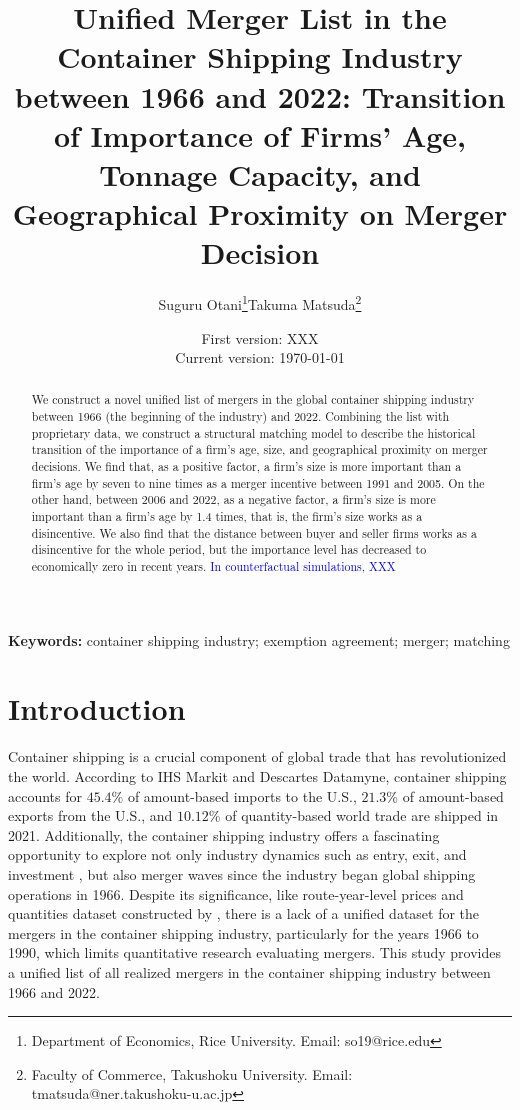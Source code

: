 \documentclass[10pt]{article}
\title{Unified Merger List in the Container Shipping Industry between 1966 and 2022: Transition of Importance of Firms' Age, Tonnage Capacity, and Geographical Proximity on Merger Decision}
\author{Suguru Otani\thanks{Department of Economics, Rice University. Email: so19@rice.edu}\quad  Takuma Matsuda\thanks{Faculty of Commerce, Takushoku University. Email: tmatsuda@ner.takushoku-u.ac.jp}}
\date{
First version: XXX\\
Current version: \today
}
\begin{document}
\maketitle

\begin{abstract}
We construct a novel unified list of mergers in the global container shipping industry between 1966  (the beginning of the industry) and 2022. Combining the list with proprietary data, we construct a structural matching model \citep{fox2018qe} to describe the historical transition of the importance of a firm's age, size, and geographical proximity on merger decisions. 
We find that, as a positive factor, a firm's size is more important than a firm's age by seven to nine times as a merger incentive between 1991 and 2005.
On the other hand, between 2006 and 2022, as a negative factor, a firm's size is more important than a firm's age by 1.4 times, that is, the firm's size works as a disincentive.
We also find that the distance between buyer and seller firms works as a disincentive for the whole period, but the importance level has decreased to economically zero in recent years. 
\textcolor{blue}{In counterfactual simulations, XXX}
\end{abstract} 

\vspace{0.1in}
\noindent\textbf{Keywords:} container shipping industry; exemption agreement;  merger; matching 
\vspace{0in}


\section{Introduction}

Container shipping is a crucial component of global trade that has revolutionized the world. 
According to IHS Markit and Descartes Datamyne, container shipping accounts for $45.4 \%$ of amount-based imports to the U.S., $21.3 \%$ of amount-based exports from the U.S., and $10.12 \%$ of quantity-based world trade are shipped in 2021. 
Additionally, the container shipping industry offers a fascinating opportunity to explore not only industry dynamics such as entry, exit, and investment \citep{otani2023industry}, but also merger waves since the industry began global shipping operations in 1966. 
Despite its significance, like route-year-level prices and quantities dataset constructed by \cite{matsuda2022unified}, there is a lack of a unified dataset for the mergers in the container shipping industry, particularly for the years 1966 to 1990, which limits quantitative research evaluating mergers. 
This study provides a unified list of all realized mergers in the container shipping industry between 1966 and 2022.
\end{document}
